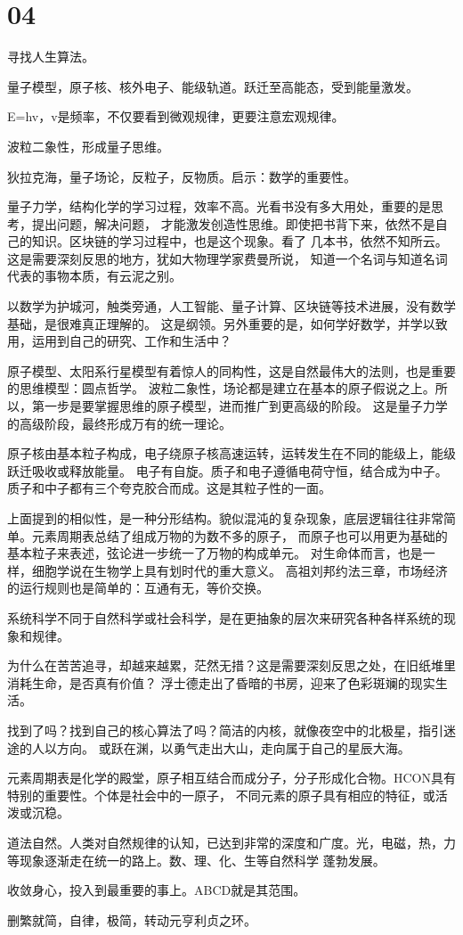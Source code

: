 \section{04}

寻找人生算法。

量子模型，原子核、核外电子、能级轨道。跃迁至高能态，受到能量激发。

E=hv，v是频率，不仅要看到微观规律，更要注意宏观规律。

波粒二象性，形成量子思维。

狄拉克海，量子场论，反粒子，反物质。启示：数学的重要性。

量子力学，结构化学的学习过程，效率不高。光看书没有多大用处，重要的是思考，提出问题，解决问题，
才能激发创造性思维。即使把书背下来，依然不是自己的知识。区块链的学习过程中，也是这个现象。看了
几本书，依然不知所云。这是需要深刻反思的地方，犹如大物理学家费曼所说，
知道一个名词与知道名词代表的事物本质，有云泥之别。

以数学为护城河，触类旁通，人工智能、量子计算、区块链等技术进展，没有数学基础，是很难真正理解的。
这是纲领。另外重要的是，如何学好数学，并学以致用，运用到自己的研究、工作和生活中？

原子模型、太阳系行星模型有着惊人的同构性，这是自然最伟大的法则，也是重要的思维模型：圆点哲学。
波粒二象性，场论都是建立在基本的原子假说之上。所以，第一步是要掌握思维的原子模型，进而推广到更高级的阶段。
这是量子力学的高级阶段，最终形成万有的统一理论。

原子核由基本粒子构成，电子绕原子核高速运转，运转发生在不同的能级上，能级跃迁吸收或释放能量。
电子有自旋。质子和电子遵循电荷守恒，结合成为中子。质子和中子都有三个夸克胶合而成。这是其粒子性的一面。

上面提到的相似性，是一种分形结构。貌似混沌的复杂现象，底层逻辑往往非常简单。元素周期表总结了组成万物的为数不多的原子，
而原子也可以用更为基础的基本粒子来表述，弦论进一步统一了万物的构成单元。
对生命体而言，也是一样，细胞学说在生物学上具有划时代的重大意义。
高祖刘邦约法三章，市场经济的运行规则也是简单的：互通有无，等价交换。

系统科学不同于自然科学或社会科学，是在更抽象的层次来研究各种各样系统的现象和规律。

为什么在苦苦追寻，却越来越累，茫然无措？这是需要深刻反思之处，在旧纸堆里消耗生命，是否真有价值？
浮士德走出了昏暗的书房，迎来了色彩斑斓的现实生活。

找到了吗？找到自己的核心算法了吗？简洁的内核，就像夜空中的北极星，指引迷途的人以方向。
或跃在渊，以勇气走出大山，走向属于自己的星辰大海。

元素周期表是化学的殿堂，原子相互结合而成分子，分子形成化合物。HCON具有特别的重要性。个体是社会中的一原子，
不同元素的原子具有相应的特征，或活泼或沉稳。

道法自然。人类对自然规律的认知，已达到非常的深度和广度。光，电磁，热，力等现象逐渐走在统一的路上。数、理、化、生等自然科学
蓬勃发展。

收敛身心，投入到最重要的事上。ABCD就是其范围。

删繁就简，自律，极简，转动元亨利贞之环。
